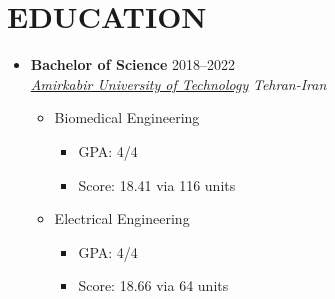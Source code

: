 \documentclass[10pt,a4paper,sans]{moderncv} %
\begin{document}
	\section{EDUCATION}
	\vspace{0.3em}
    \begin{itemize}
		
		\item \textbf{Bachelor of Science} \hfill 2018--2022\\
		\href{http://aut.ac.ir/aut/}{ \emph{Amirkabir University of Technology}} \hfill \emph{Tehran-Iran}
		

		\begin{itemize}
			\item Biomedical Engineering %
			\begin{itemize}		
				\item GPA: 4/4
                \item Score: 18.41 via 116 units
			\end{itemize}
		\end{itemize}

		\begin{itemize}
			\item Electrical Engineering %
			\begin{itemize}		
				\item GPA: 4/4
                \item Score: 18.66 via 64 units
			\end{itemize}
		\end{itemize}

	\end{itemize}
\end{document}

